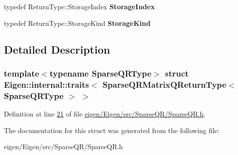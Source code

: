 \begin{DoxyCompactItemize}
\item 
\mbox{\label{struct_eigen_1_1internal_1_1traits_3_01_sparse_q_r_matrix_q_return_type_3_01_sparse_q_r_type_01_4_01_4_a303535df1a3827af299a706d47a02bd4}} 
typedef Return\+Type\+::\+Storage\+Index {\bfseries Storage\+Index}
\item 
\mbox{\label{struct_eigen_1_1internal_1_1traits_3_01_sparse_q_r_matrix_q_return_type_3_01_sparse_q_r_type_01_4_01_4_a59f0fdbde763c7056db7e8f2b0c5ee9f}} 
typedef Return\+Type\+::\+Storage\+Kind {\bfseries Storage\+Kind}
\end{DoxyCompactItemize}


\subsection{Detailed Description}
\subsubsection*{template$<$typename Sparse\+Q\+R\+Type$>$\newline
struct Eigen\+::internal\+::traits$<$ Sparse\+Q\+R\+Matrix\+Q\+Return\+Type$<$ Sparse\+Q\+R\+Type $>$ $>$}



Definition at line \hyperlink{eigen_2_eigen_2src_2_sparse_q_r_2_sparse_q_r_8h_source_l00021}{21} of file \hyperlink{eigen_2_eigen_2src_2_sparse_q_r_2_sparse_q_r_8h_source}{eigen/\+Eigen/src/\+Sparse\+Q\+R/\+Sparse\+Q\+R.\+h}.



The documentation for this struct was generated from the following file\+:\begin{DoxyCompactItemize}
\item 
eigen/\+Eigen/src/\+Sparse\+Q\+R/\+Sparse\+Q\+R.\+h\end{DoxyCompactItemize}

